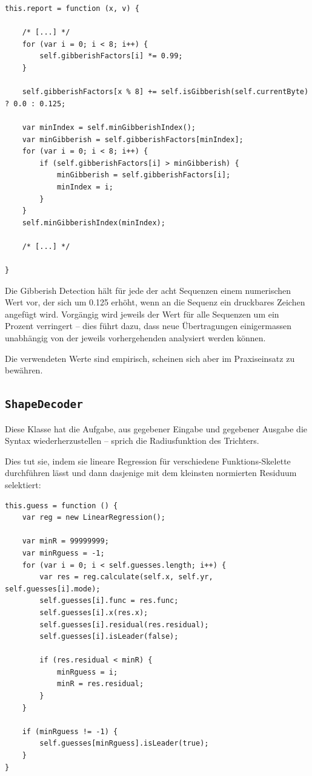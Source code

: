 \documentclass[11pt]{scrreprt} %
\theoremstyle{definition}
\begin{document}
\begin{lstlisting}
this.report = function (x, v) {
	
	/* [...] */
	for (var i = 0; i < 8; i++) {
		self.gibberishFactors[i] *= 0.99;
	}

	self.gibberishFactors[x % 8] += self.isGibberish(self.currentByte) ? 0.0 : 0.125;
		
	var minIndex = self.minGibberishIndex();
	var minGibberish = self.gibberishFactors[minIndex];
	for (var i = 0; i < 8; i++) {
		if (self.gibberishFactors[i] > minGibberish) {
			minGibberish = self.gibberishFactors[i];
			minIndex = i;
		}
	}
	self.minGibberishIndex(minIndex);

	/* [...] */

}
\end{lstlisting}

Die Gibberish Detection hält für jede der acht Sequenzen einem numerischen Wert vor, der sich um 0.125 erhöht, wenn an die Sequenz ein druckbares Zeichen angefügt wird. Vorgängig wird jeweils der Wert für alle Sequenzen um ein Prozent verringert -- dies führt dazu, dass neue Übertragungen einigermassen unabhängig von der jeweils vorhergehenden analysiert werden können.

Die verwendeten Werte sind empirisch, scheinen sich aber im Praxiseinsatz zu bewähren.

\subsection{{\tt ShapeDecoder}}

Diese Klasse hat die Aufgabe, aus gegebener Eingabe und gegebener Ausgabe die Syntax wiederherzustellen -- sprich die Radiusfunktion des Trichters.

Dies tut sie, indem sie lineare Regression für verschiedene Funktions-Skelette durchführen lässt und dann dasjenige mit dem kleinsten normierten Residuum selektiert:

\begin{lstlisting}
this.guess = function () {
	var reg = new LinearRegression();
		
	var minR = 99999999;
	var minRguess = -1;
	for (var i = 0; i < self.guesses.length; i++) {
		var res = reg.calculate(self.x, self.yr, self.guesses[i].mode);
		self.guesses[i].func = res.func;
		self.guesses[i].x(res.x);
		self.guesses[i].residual(res.residual);
		self.guesses[i].isLeader(false);
			
		if (res.residual < minR) {
			minRguess = i;
			minR = res.residual;
		}
	}
		
	if (minRguess != -1) {
		self.guesses[minRguess].isLeader(true);
	}
}

\end{lstlisting}
\end{document}

